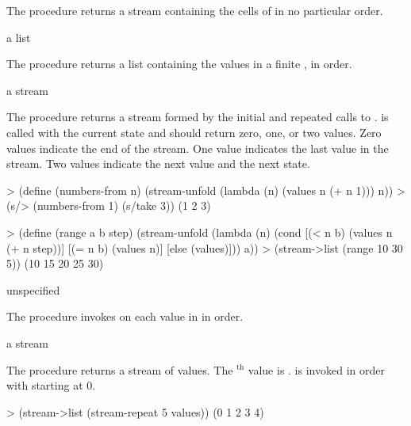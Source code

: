 The  procedure returns a stream containing the cells of
 in no particular order.

\begin{procedure}
\end{procedure}
\returns{} a list

The  procedure returns a list containing the values in a finite
, in order.

\begin{procedure}
\end{procedure}
\returns{} a stream

The  procedure returns a stream formed by the initial  and
repeated calls to .  is called with the current state and
should return zero, one, or two values. Zero values indicate the end of the stream. One
value indicates the last value in the stream. Two values indicate the next value and the
next state.

\codebegin
> (define (numbers-from n)
    (stream-unfold (lambda (n) (values n (+ n 1))) n))
> (s/> (numbers-from 1) (s/take 3))
(1 2 3)
\codeend

\codebegin
> (define (range a b step)
    (stream-unfold
     (lambda (n)
       (cond
        [(< n b) (values n (+ n step))]
        [(= n b) (values n)]
        [else (values)]))
     a))
> (stream->list (range 10 30 5))
(10 15 20 25 30)
\codeend

\begin{procedure}
\end{procedure}
\returns{} unspecified

The  procedure invokes  on each value in 
in order.

\begin{procedure}
\end{procedure}
\returns{} a stream

The  procedure returns a stream of  values. The
$^\textrm{th}$ value is .  is invoked in
order with  starting at 0.

\codebegin
> (stream->list (stream-repeat 5 values))
(0 1 2 3 4)
\codeend

